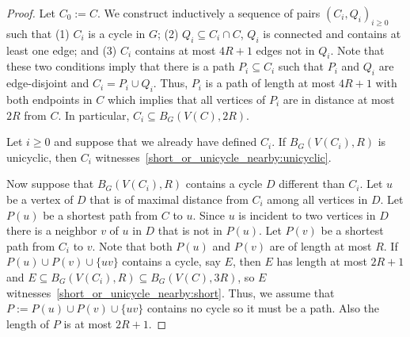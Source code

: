 \documentclass{patmorin}
\begin{document}
\begin{proof}
  Let $C_0:=C$.
  We construct inductively a sequence of pairs $(C_i,Q_i)_{i\geq0}$ such that
  (1) $C_i$ is a cycle in $G$;
  (2) $Q_i\subseteq C_i\cap C$, $Q_i$ is connected and contains at least one edge; and
  (3) $C_i$ contains at most $4R+1$ edges not in $Q_i$.
  Note that these two conditions imply that there is a path $P_i\subseteq C_i$  such that
  $P_i$ and $Q_i$ are edge-disjoint and $C_i=P_i\cup Q_i$.
  Thus, $P_i$ is a path of length at most $4R+1$ with both endpoints in $C$
  which implies that all vertices of $P_i$ are in distance at most $2R$ from $C$.
  In particular, $C_i\subseteq B_G(V(C),2R)$.

  Let $i\geq0$ and suppose that we already have defined $C_i$.
  If $B_G(V(C_i),R)$ is unicyclic, then $C_i$ witnesses~\eqref{short_or_unicycle_nearby:unicyclic}.

  Now suppose that $B_G(V(C_i),R)$ contains a cycle $D$ different than $C_i$.
  Let $u$ be a vertex of $D$ that is of maximal distance from $C_i$ among all vertices in $D$.
  Let $P(u)$ be a shortest path from $C$ to $u$.
  Since $u$ is incident to two vertices in $D$ there is a neighbor $v$ of $u$ in $D$ that is not in $P(u)$.
  Let $P(v)$ be a shortest path from $C_i$ to $v$.
  Note that both $P(u)$ and $P(v)$ are of length at most $R$.
  If $P(u)\cup P(v)\cup\{uv\}$ contains a cycle, say $E$, then $E$ has length at most $2R+1$ and $E\subseteq B_G(V(C_i),R)\subseteq B_G(V(C),3R)$, so $E$ witnesses~\eqref{short_or_unicycle_nearby:short}.
  Thus, we assume that $P:=P(u)\cup P(v)\cup\{uv\}$ contains no cycle so it must be a path.
  Also the length of $P$ is at most $2R+1$.


\end{proof}
\end{document}
